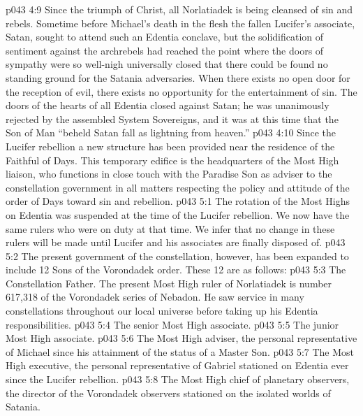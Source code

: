 \vs p043 4:9 \pc Since the triumph of Christ, all Norlatiadek is being cleansed of sin and rebels. Sometime before Michael’s death in the flesh the fallen Lucifer’s associate, Satan, sought to attend such an Edentia conclave, but the solidification of sentiment against the archrebels had reached the point where the doors of sympathy were so well\hyp{}nigh universally closed that there could be found no standing ground for the Satania adversaries. When there exists no open door for the reception of evil, there exists no opportunity for the entertainment of sin. The doors of the hearts of all Edentia closed against Satan; he was unanimously rejected by the assembled System Sovereigns, and it was at this time that the Son of Man “beheld Satan fall as lightning from heaven.”
\vs p043 4:10 Since the Lucifer rebellion a new structure has been provided near the residence of the Faithful of Days. This temporary edifice is the headquarters of the Most High liaison, who functions in close touch with the Paradise Son as adviser to the constellation government in all matters respecting the policy and attitude of the order of Days toward sin and rebellion.
\vs p043 5:1 The rotation of the Most Highs on Edentia was suspended at the time of the Lucifer rebellion. We now have the same rulers who were on duty at that time. We infer that no change in these rulers will be made until Lucifer and his associates are finally disposed of.
\vs p043 5:2 The present government of the constellation, however, has been expanded to include 12 Sons of the Vorondadek order. These 12 are as follows:
\vs p043 5:3 \bibnobreakspace The Constellation Father. The present Most High ruler of Norlatiadek is number 617,318 of the Vorondadek series of Nebadon. He saw service in many constellations throughout our local universe before taking up his Edentia responsibilities.
\vs p043 5:4 \bibnobreakspace The senior Most High associate.
\vs p043 5:5 \bibnobreakspace The junior Most High associate.
\vs p043 5:6 \bibnobreakspace The Most High adviser, the personal representative of Michael since his attainment of the status of a Master Son.
\vs p043 5:7 \bibnobreakspace The Most High executive, the personal representative of Gabriel stationed on Edentia ever since the Lucifer rebellion.
\vs p043 5:8 \bibnobreakspace The Most High chief of planetary observers, the director of the Vorondadek observers stationed on the isolated worlds of Satania.
